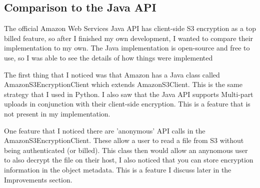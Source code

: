 \subsection{Comparison to the Java API}
The official Amazon Web Services Java API has client-side S3 encryption as a top billed feature, so after I finished my own development,
I wanted to compare their implementation to my own. The Java implementation is open-source and free to use, so I was able to see the details of how things were implemented

The first thing that I noticed  was that Amazon has a Java class called AmazonS3EncryptionClient which extends AmazonS3Client. This is the same strategy that I used in Python. I also saw that the Java API supports Multi-part uploads in conjunction with their client-side encryption. This is a feature that is not present in my implementation.

One feature that I noticed there are 'anonymous' API calls in the AmazonS3EncryptionClient. These allow a user to read a file from 
S3 without being authenticated (or billed). This class then would allow an anynomous user to also decrypt the file on their host, 
I also noticed that you can store encryption information in the object metadata. This is a feature I discuss later in the Improvements section.

